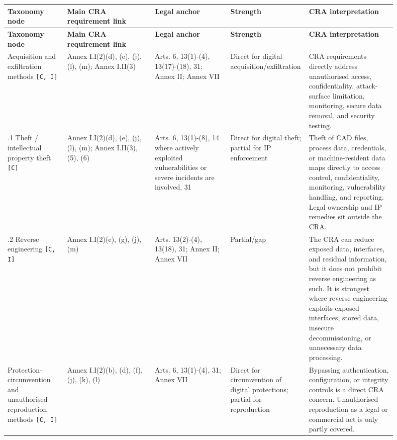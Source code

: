 \documentclass[10pt,a4paper,oneside]{report}
\begin{document}
\begin{landscape}
\begingroup
\scriptsize
\setlength{\tabcolsep}{4pt}
\begin{longtable}{@{}>{\RaggedRight\arraybackslash}p{0.15\linewidth}>{\RaggedRight\arraybackslash}p{0.22\linewidth}>{\RaggedRight\arraybackslash}p{0.19\linewidth}>{\RaggedRight\arraybackslash}p{0.12\linewidth}>{\RaggedRight\arraybackslash}p{0.22\linewidth}@{}}
\toprule
\textbf{Taxonomy node} & \textbf{Main CRA requirement link} & \textbf{Legal anchor} & \textbf{Strength} & \textbf{CRA interpretation} \\
\midrule
\endfirsthead
\toprule
\textbf{Taxonomy node} & \textbf{Main CRA requirement link} & \textbf{Legal anchor} & \textbf{Strength} & \textbf{CRA interpretation} \\
\midrule
\endhead
3.1 Acquisition and exfiltration methods \texttt{[C, I]} & Annex I.I(2)(d), (e), (j), (l), (m); Annex I.II(3) & Arts. 6, 13(1)-(4), 13(17)-(18), 31; Annex II; Annex VII & Direct for digital acquisition/exfiltration & CRA requirements directly address unauthorised access, confidentiality, attack-surface limitation, monitoring, secure data removal, and security testing. \\
3.1.1 Theft / intellectual property theft \texttt{[C]} & Annex I.I(2)(d), (e), (j), (l), (m); Annex I.II(3), (5), (6) & Arts. 6, 13(1)-(8), 14 where actively exploited vulnerabilities or severe incidents are involved, 31 & Direct for digital theft; partial for IP enforcement & Theft of CAD files, process data, credentials, or machine-resident data maps directly to access control, confidentiality, monitoring, vulnerability handling, and reporting. Legal ownership and IP remedies sit outside the CRA. \\
3.1.2 Reverse engineering \texttt{[C, I]} & Annex I.I(2)(e), (g), (j), (m) & Arts. 13(2)-(4), 13(18), 31; Annex II; Annex VII & Partial/gap & The CRA can reduce exposed data, interfaces, and residual information, but it does not prohibit reverse engineering as such. It is strongest where reverse engineering exploits exposed interfaces, stored data, insecure decommissioning, or unnecessary data processing. \\
3.2 Protection-circumvention and unauthorised reproduction methods \texttt{[C, I]} & Annex I.I(2)(b), (d), (f), (j), (k), (l) & Arts. 6, 13(1)-(4), 31; Annex VII & Direct for circumvention of digital protections; partial for reproduction & Bypassing authentication, configuration, or integrity controls is a direct CRA concern. Unauthorised reproduction as a legal or commercial act is only partly covered. \\

\end{longtable}
\end{landscape}
\end{document}
